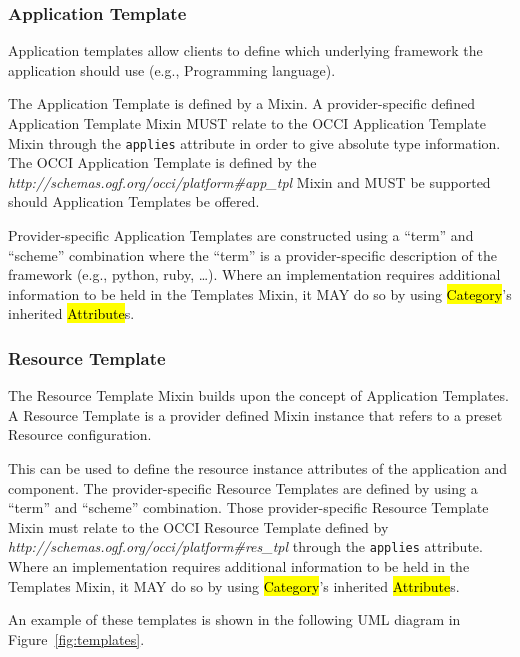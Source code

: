 \documentclass[10pt,a4paper]{article}
\begin{document}
\subsubsection{Application Template}
Application templates allow clients to define which underlying framework the application should use (e.g., Programming language).

The Application Template is defined by a Mixin. A provider-specific defined Application Template Mixin MUST relate to the OCCI Application Template Mixin through the \texttt{applies} attribute in order to give absolute type information. The OCCI Application Template is defined by the \textit{http://schemas.ogf.org/occi/platform\#app\_tpl} Mixin and MUST be supported should Application Templates be offered.

Provider-specific Application Templates are constructed using a ``term'' and ``scheme'' combination where the ``term'' is a provider-specific description of the framework (e.g., python, ruby, \dots{}). Where an implementation requires additional information to be held in the Templates Mixin, it MAY do so by using \hl{Category}’s inherited \hl{Attribute}s.

\subsubsection{Resource Template}
The Resource Template Mixin builds upon the concept of Application Templates. A Resource Template is a provider defined Mixin instance that refers to a preset Resource configuration.

This can be used to define the resource instance attributes of the application and component. The provider-specific Resource Templates are defined by using a ``term'' and ``scheme'' combination. Those provider-specific Resource Template Mixin must relate to the OCCI Resource Template defined by \textit{http://schemas.ogf.org/occi/platform\#res\_tpl} through the \texttt{applies} attribute. Where an implementation requires additional information to be held in the Templates Mixin, it MAY do so by using \hl{Category}’s inherited \hl{Attribute}s.

An example of these templates is shown in the following UML diagram in Figure~\ref{fig:templates}.
\end{document}
